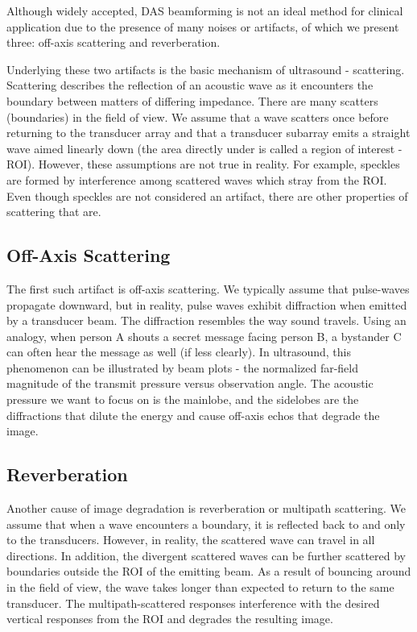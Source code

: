Although widely accepted, DAS beamforming is not an ideal method for clinical application due to the presence of many noises or artifacts, of which we present three: off-axis scattering and reverberation.

Underlying these two artifacts is the basic mechanism of ultrasound - scattering. Scattering describes the reflection of an acoustic wave as it encounters the boundary between matters of differing impedance. There are many scatters (boundaries) in the field of view. We assume that a wave scatters once before returning to the transducer array and that a transducer subarray emits a straight wave aimed linearly down (the area directly under is called a region of interest - ROI). However, these assumptions are not true in reality. For example, speckles are formed by interference among scattered waves which stray from the ROI. Even though speckles are not considered an artifact, there are other properties of scattering that are.


\subsection{Off-Axis Scattering}

The first such artifact is off-axis scattering. We typically assume that pulse-waves propagate downward, but in reality, pulse waves exhibit diffraction when emitted by a transducer beam. The diffraction resembles the way sound travels. Using an analogy, when person A shouts a secret message facing person B, a bystander C can often hear the message as well (if less clearly). In ultrasound, this phenomenon can be illustrated by beam plots - the normalized far-field magnitude of the transmit pressure versus observation angle. The acoustic pressure we want to focus on is the mainlobe, and the sidelobes are the diffractions that dilute the energy and cause off-axis echos that degrade the image.


\subsection{Reverberation}

Another cause of image degradation is reverberation or multipath scattering. We assume that when a wave encounters a boundary, it is reflected back to and only to the transducers. However, in reality, the scattered wave can travel in all directions. In addition, the divergent scattered waves can be further scattered by boundaries outside the ROI of the emitting beam. As a result of bouncing around in the field of view, the wave takes longer than expected to return to the same transducer. The multipath-scattered responses interference with the desired vertical responses from the ROI and degrades the resulting image.


